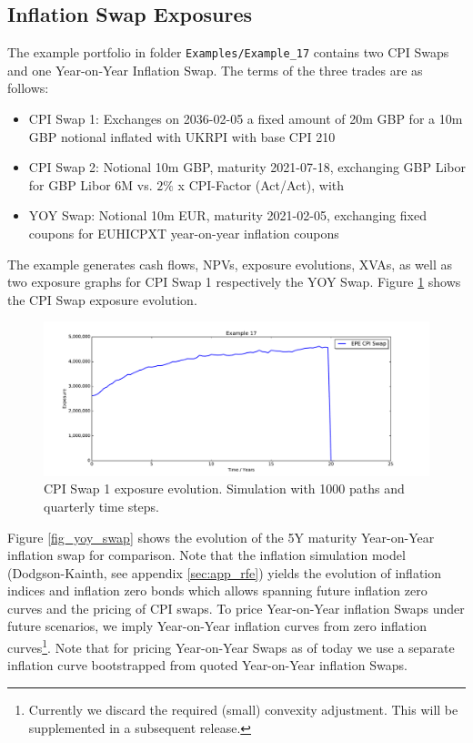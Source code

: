 \documentclass[12pt, a4paper]{article}
\begin{document}
\subsection{Inflation Swap Exposures}%

The example portfolio in folder {\tt Examples/Example\_17} contains two CPI Swaps and one Year-on-Year Inflation Swap.
The terms of the three trades are as follows:

\begin{itemize}
\item CPI Swap 1: Exchanges on 2036-02-05 a fixed amount of 20m GBP for a 10m GBP notional inflated with UKRPI with base CPI 210
\item CPI Swap 2: Notional 10m GBP, maturity 2021-07-18, exchanging GBP Libor for GBP Libor 6M vs. $2\%$ x CPI-Factor (Act/Act), with
\item YOY Swap: Notional 10m EUR, maturity 2021-02-05, exchanging fixed coupons for EUHICPXT year-on-year inflation coupons
\end{itemize}

The example generates cash flows, NPVs, exposure evolutions, XVAs, as well as two exposure graphs for CPI Swap 1 respectively the YOY Swap. Figure \ref{fig_cpi_swap} shows the CPI Swap exposure evolution.

\begin{figure}[h!]
	\begin{center}
		\includegraphics[scale=0.45]{mpl_cpi_swap.pdf}
	\end{center}
	\caption{CPI Swap 1 exposure evolution. Simulation with 1000 paths and quarterly time steps.}
	\label{fig_cpi_swap}
\end{figure}

Figure \ref{fig_yoy_swap} shows the evolution of the 5Y maturity Year-on-Year inflation swap for comparison. Note that the inflation simulation model (Dodgson-Kainth, see appendix \ref{sec:app_rfe}) yields the evolution of inflation indices and inflation zero bonds which allows spanning future inflation zero curves and the pricing of CPI swaps. To price Year-on-Year inflation Swaps under future scenarios, we imply Year-on-Year inflation curves from zero inflation curves\footnote{Currently we discard the required (small) convexity adjustment. This will be supplemented in a subsequent release.}. Note that for pricing Year-on-Year Swaps as of today we use a separate inflation curve bootstrapped from quoted Year-on-Year inflation Swaps.
 
\end{document}

